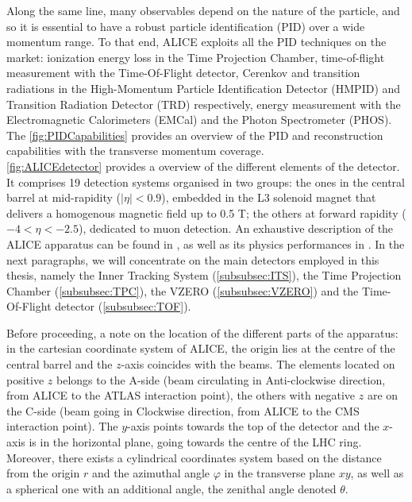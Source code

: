 Along the same line, many observables depend on the nature of the particle, and so it is essential to have a robust particle identification (PID) over a wide momentum range. To that end, ALICE exploits all the PID techniques on the market: ionization energy loss in the Time Projection Chamber, time-of-flight measurement with the Time-Of-Flight detector, Cerenkov and transition radiations in the High-Momentum Particle Identification Detector (HMPID) and Transition Radiation Detector (TRD) respectively, energy measurement with the Electromagnetic Calorimeters (EMCal) and the Photon Spectrometer (PHOS). The \fig\ref{fig:PIDCapabilities} provides an overview of the PID and reconstruction capabilities with the transverse momentum coverage.\\


\Fig\ref{fig:ALICEdetector} provides a overview of the different elements of the detector. It comprises 19 detection systems organised in two groups: the ones in the central barrel at mid-rapidity ($|\eta| < 0.9$), embedded in the L3 solenoid magnet that delivers a homogenous magnetic field up to 0.5 T; the others at forward rapidity ($-4 < \eta < -2.5$), dedicated to muon detection. An exhaustive description of the ALICE apparatus can be found in \cite{alicecollaborationALICEExperimentCERN2008}, as well as its physics performances in \cite{carminatiALICEPhysicsPerformance2004}\cite{alicecollaborationALICEPhysicsPerformance2006}\cite{alicecollaborationPerformanceALICEExperiment2014}. In the next paragraphs, we will concentrate on the main detectors employed in this thesis, namely the Inner Tracking System (\Sec\ref{subsubsec:ITS}), the Time Projection Chamber (\Sec\ref{subsubsec:TPC}), the VZERO (\Sec\ref{subsubsec:VZERO}) and the Time-Of-Flight detector (\Sec\ref{subsubsec:TOF}). 

Before proceeding, a note on the location of the different parts of the apparatus: in the cartesian coordinate system of ALICE, the origin lies at the centre of the central barrel and the $z$-axis coincides with the beams. The elements located on positive $z$ belongs to the A-side (beam circulating in Anti-clockwise direction, from ALICE to the ATLAS interaction point), the others with negative $z$ are on the C-side (beam going in Clockwise direction, from ALICE to the CMS interaction point). The $y$-axis points towards the top of the detector and the $x$-axis is in the horizontal plane, going towards the centre of the LHC ring. Moreover, there exists a cylindrical coordinates system based on the distance from the origin $r$ and the azimuthal angle $\varphi$ in the transverse plane $xy$, as well as a spherical one with an additional angle, the zenithal angle denoted $\theta$.


